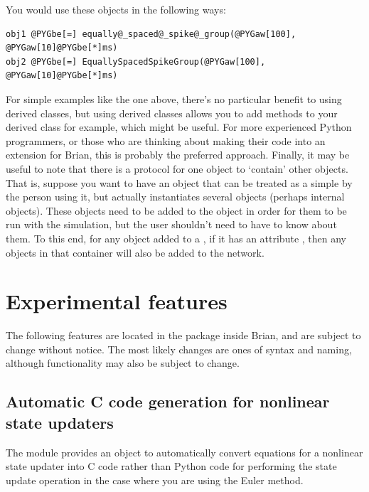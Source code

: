 \documentclass[letterpaper,10pt,english]{manual}
\begin{document}
You would use these objects in the following ways:

\begin{Verbatim}[commandchars=@\[\]]
obj1 @PYGbe[=] equally@_spaced@_spike@_group(@PYGaw[100], @PYGaw[10]@PYGbe[*]ms)
obj2 @PYGbe[=] EquallySpacedSpikeGroup(@PYGaw[100], @PYGaw[10]@PYGbe[*]ms)
\end{Verbatim}

For simple examples like the one above, there's no particular benefit to
using derived classes, but using derived classes allows you to add
methods to your derived class for example, which might be useful. For
more experienced Python programmers, or those who are thinking about
making their code into an extension for Brian, this is probably the
preferred approach.
Finally, it may be useful to note that there is a protocol for one object
to `contain' other objects. That is, suppose you want to have an object
that can be treated as a simple \hyperlink{brian.NeuronGroup}{} by the person using it,
but actually instantiates several objects (perhaps internal \hyperlink{brian.Connection}{}
objects). These objects need to be added to the \hyperlink{brian.Network}{} object
in order for them to be run with the simulation, but the user shouldn't need
to have to know about them. To this end, for any object added to a
\hyperlink{brian.Network}{}, if it has an attribute , then any
objects in that container will also be added to the network.

\resetcurrentobjects


\chapter{Experimental features}

The following features are located in the  package inside Brian, and are subject to change
without notice. The most likely changes are ones of syntax and naming, although functionality may also
be subject to change.

\resetcurrentobjects


\hypertarget{ccodegen}{}\section{Automatic C code generation for nonlinear state updaters}

The  module provides an object 
to automatically convert equations for a nonlinear state updater into C code rather than Python code
for performing the state update operation in the case where you are using the Euler method.
\end{document}

